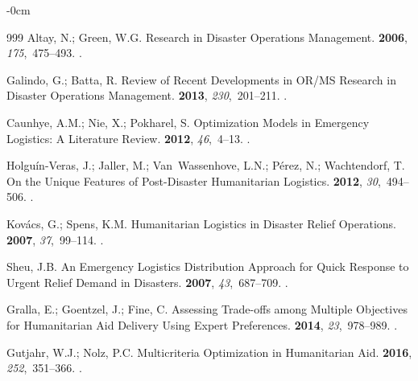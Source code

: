 \documentclass[systems,article,accept,moreauthors,pdftex]{Definitions/mdpi}
\begin{document}
\begin{adjustwidth}{-\extralength}{0cm}
\begin{thebibliography}{999}
Altay, N.; Green, W.G.
 Research in Disaster Operations Management.
 {\bf 2006}, {\em
  175},~475--493.
.

Galindo, G.; Batta, R.
\newblock Review of Recent Developments in {OR/MS} Research in Disaster
  Operations Management.
 {\bf 2013}, {\em
  230},~201--211.
.

Caunhye, A.M.; Nie, X.; Pokharel, S.
\newblock Optimization Models in Emergency Logistics: A Literature Review.
 {\bf 2012}, {\em 46},~4--13.
.

Holgu{\'i}n-Veras, J.; Jaller, M.; Van~Wassenhove, L.N.; P{\'e}rez, N.;
  Wachtendorf, T.
\newblock On the Unique Features of Post-Disaster Humanitarian Logistics.
 {\bf 2012}, {\em
  30},~494--506.
.

Kov{\'a}cs, G.; Spens, K.M.
\newblock Humanitarian Logistics in Disaster Relief Operations.
 {\bf 2007}, {\em 37},~99--114.
.

Sheu, J.B.
\newblock An Emergency Logistics Distribution Approach for Quick Response to
  Urgent Relief Demand in Disasters.
 {\bf 2007}, {\em 43},~687--709.
.

Gralla, E.; Goentzel, J.; Fine, C.
\newblock Assessing Trade-offs among Multiple Objectives for Humanitarian Aid
  Delivery Using Expert Preferences.
 {\bf 2014}, {\em
  23},~978--989.
.

Gutjahr, W.J.; Nolz, P.C.
\newblock Multicriteria Optimization in Humanitarian Aid.
 {\bf 2016}, {\em
  252},~351--366.
.


\end{thebibliography}
\end{adjustwidth}
\end{document}

